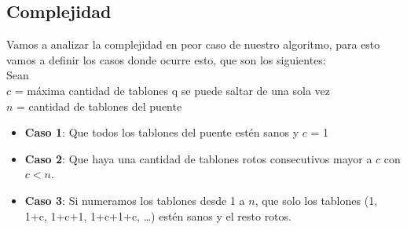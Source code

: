 





\subsection{Complejidad}

Vamos a analizar la complejidad en peor caso de nuestro algoritmo, para esto vamos a definir los casos donde ocurre esto, que son los siguientes: \\
Sean \\
 $c$ = máxima cantidad de tablones q se puede saltar de una sola vez \\
 $n$ = cantidad de tablones del puente
\begin{itemize}
	\item \textbf{Caso 1}: Que todos los tablones del puente estén sanos y $c$ = 1
	\item \textbf{Caso 2}: Que haya una cantidad de tablones rotos consecutivos mayor a $c$ con $c < n$.
	\item \textbf{Caso 3}: Si numeramos los tablones desde 1 a $n$, que solo los tablones (1, 1+c, 1+c+1, 1+c+1+c, …) estén sanos y el resto rotos.
\end{itemize}

